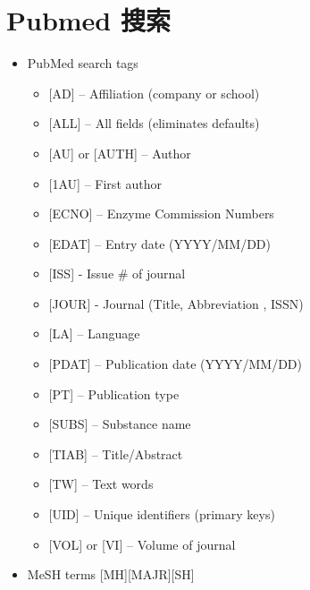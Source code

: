 \documentclass[
]{book}
\providecommand{\tightlist}{%
  \setlength{\itemsep}{0pt}\setlength{\parskip}{0pt}}
\begin{document}
\hypertarget{pubmed-ux641cux7d22}{%
\section{Pubmed 搜索}\label{pubmed-ux641cux7d22}}

\begin{itemize}
\tightlist
\item
  PubMed search tags

  \begin{itemize}
  \tightlist
  \item
    {[}AD{]} -- Affiliation (company or school)
  \item
    {[}ALL{]} -- All fields (eliminates defaults)
  \item
    {[}AU{]} or {[}AUTH{]} -- Author
  \item
    {[}1AU{]} -- First author
  \item
    {[}ECNO{]} -- Enzyme Commission Numbers
  \item
    {[}EDAT{]} -- Entry date (YYYY/MM/DD)
  \item
    {[}ISS{]} - Issue \# of journal
  \item
    {[}JOUR{]} - Journal (Title, Abbreviation , ISSN)
  \item
    {[}LA{]} -- Language
  \item
    {[}PDAT{]} -- Publication date (YYYY/MM/DD)
  \item
    {[}PT{]} -- Publication type
  \item
    {[}SUBS{]} -- Substance name
  \item
    {[}TIAB{]} -- Title/Abstract
  \item
    {[}TW{]} -- Text words
  \item
    {[}UID{]} -- Unique identifiers (primary keys)
  \item
    {[}VOL{]} or {[}VI{]} -- Volume of journal
  \end{itemize}
\item
  MeSH terms {[}MH{]}{[}MAJR{]}{[}SH{]}


\end{itemize}
\end{document}
